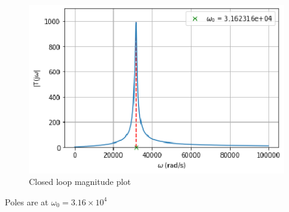 \begin{enumerate}[label=\thesection.\arabic*.,ref=\thesection.\theenumi]
\begin{figure}[!ht]
    \centering
    \includegraphics[width=\columnwidth]{./figs/ee18btech11028/ee18btech11028_2_4.eps}
    \caption{Closed loop magnitude plot}
    \label{fig:ee18btech11026_2_4}
\end{figure}

Poles are at $\omega_{0} = 3.16 \times 10^{4}$


\end{enumerate}